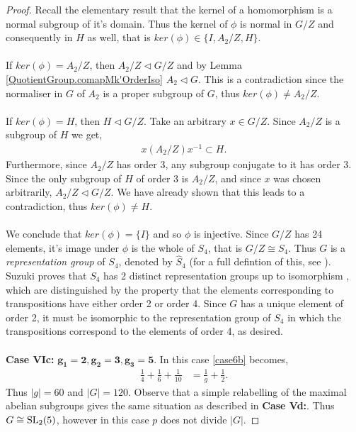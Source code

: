 \begin{proof}
Recall the elementary result that the kernel of a homomorphism is a normal subgroup of it's domain. Thus the kernel of $\phi$ is normal in $G / Z$ and consequently in $H$ as well, that is $ker(\phi) \in\{ I , A_2 / Z, H \}$. \\
\\
If $ker(\phi) = A_2 / Z$, then $A_2 / Z \vartriangleleft G / Z$ and by Lemma \ref{QuotientGroup.comapMk'OrderIso} $A_2 \vartriangleleft G$. This is a contradiction since the normaliser in $G$ of $A_2$ is a proper subgroup of $G$, thus $ker(\phi) \neq A_2 / Z$. \\
\\
If $ker(\phi) = H$, then $H \vartriangleleft G / Z$. Take an arbitrary $x \in G / Z$. Since $A_2 / Z$ is a subgroup of $H$ we get,
\begin{align*} x (A_2 / Z) x^{-1} \subset H.
\end{align*}
Furthermore, since $A_2 / Z$ has order 3, any subgroup conjugate to it has order 3. Since the only subgroup of $H$ of order 3 is $A_2 / Z$, and since $x$ was chosen arbitrarily, $A_2 / Z \vartriangleleft G / Z$. We have already shown that this leads to a contradiction, thus $ker(\phi) \neq H$. \\
\\
We conclude that $ker(\phi) = \{ I \}$ and so $\phi$ is injective. Since $G / Z$ has 24 elements, it's image under $\phi$ is the whole of $S_4$, that is $G / Z \cong S_4$. Thus $G$ is a \textit{representation group} of $S_4$, denoted by $\widehat{S}_4$ (for a full defintion of this, see \cite{suzuki}). Suzuki proves that $S_4$ has 2 distinct representation groups up to isomorphism \cite[p.301]{suzuki}, which are distinguished by the property that the elements corresponding to transpositions have either order 2 or order 4. Since $G$ has a unique element of order 2, it must be isomorphic to the representation group of $S_4$ in which the transpositions correspond to the elements of order 4, as desired.\\
\\
 \space \textbf{Case VIc:} $\pmb{g_1 = 2, g_2 = 3, g_3 = 5}$.  In this case \eqref{case6b} becomes,
\begin{align*} \frac{1}{4} + \frac{1}{6} + \frac{1}{10} &= \frac{1}{g} + \frac{1}{2}.
\end{align*}
Thus $|g| = 60$ and $|G| = 120$. Observe that a simple relabelling of the maximal abelian subgroups gives the same situation as described in \textbf{Case Vd:}. Thus $G \cong \operatorname{SL}_2(5)$, however in this case $p$ does not divide $|G|$.

\end{proof}

